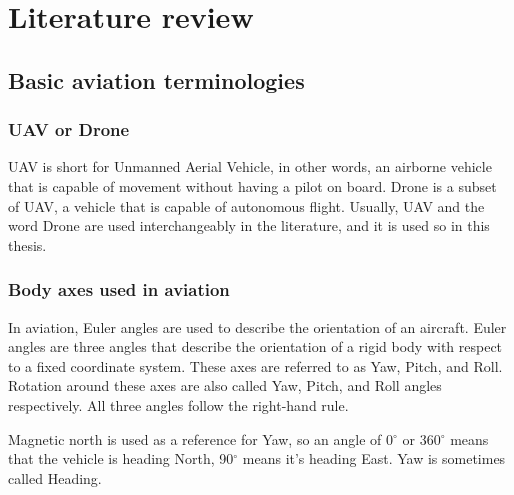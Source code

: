 \chapter{Literature review} \label{chap:literature_review}

\section{Basic aviation terminologies}

\subsection{UAV or Drone}
UAV is short for Unmanned Aerial Vehicle, in other words, an airborne vehicle that is capable of movement
without having a pilot on board. Drone is a subset of UAV, a vehicle that is capable of autonomous flight.
Usually, UAV and the word Drone are used interchangeably in the literature, and it is used so in this thesis.

\subsection{Body axes used in aviation}
In aviation, Euler angles are used to describe the orientation of an aircraft. Euler angles are three angles
that describe the orientation of a rigid body with respect to a fixed coordinate system. These axes are 
referred to as Yaw, Pitch, and Roll. Rotation around these axes are also called Yaw, Pitch, and Roll angles respectively.
All three angles follow the right-hand rule. 

Magnetic north is used as a reference for Yaw, so an angle of 0$^\circ$ or 360$^\circ$ means that the vehicle
is heading North, 90$^\circ$ means it's heading East. Yaw is sometimes called Heading.

